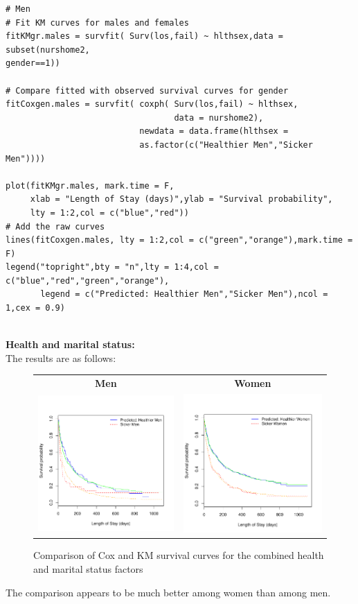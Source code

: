 \documentclass[11pt,psfig]{book}
\begin{document}
\small
\begin{verbatim}
# Men
# Fit KM curves for males and females
fitKMgr.males = survfit( Surv(los,fail) ~ hlthsex,data = subset(nurshome2, 
gender==1))

# Compare fitted with observed survival curves for gender
fitCoxgen.males = survfit( coxph( Surv(los,fail) ~ hlthsex, 
                                  data = nurshome2),
                           newdata = data.frame(hlthsex = 
                           as.factor(c("Healthier Men","Sicker Men"))))

plot(fitKMgr.males, mark.time = F,
     xlab = "Length of Stay (days)",ylab = "Survival probability",
     lty = 1:2,col = c("blue","red"))
# Add the raw curves
lines(fitCoxgen.males, lty = 1:2,col = c("green","orange"),mark.time = F)
legend("topright",bty = "n",lty = 1:4,col = c("blue","red","green","orange"),
       legend = c("Predicted: Healthier Men","Sicker Men"),ncol = 1,cex = 0.9)
\end{verbatim}
~\\[2ex]
{\bf Health and marital status:}
\\[2ex]
The results are as follows:
\begin{figure}[htp]
\caption{Comparison of Cox and KM survival curves for the combined health and marital status factors}
\begin{center}
\begin{tabular}{cc}
{\bf Men} & {\bf Women}\\
\includegraphics[width=2.5in]{ch12kmph_males.pdf} &
\includegraphics[width=2.5in]{ch12kmph_females.pdf}
\end{tabular}
\end{center}
\end{figure}
The comparison appears to be much better among women than among men.
\end{document}
